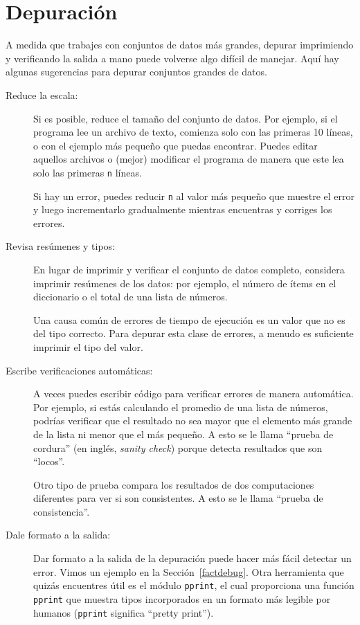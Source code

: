 \documentclass[10pt]{book}
\begin{document}
\section{Depuración}

A medida que trabajes con conjuntos de datos más grandes, depurar imprimiendo y
verificando la salida a mano puede volverse algo difícil de manejar.  Aquí hay algunas
sugerencias para depurar conjuntos grandes de datos.

\begin{description}

\item[Reduce la escala:] Si es posible, reduce el tamaño del
conjunto de datos.  Por ejemplo, si el programa lee un archivo de texto, comienza 
solo con las primeras 10 líneas, o con el ejemplo más pequeño que puedas encontrar.
Puedes editar aquellos archivos o (mejor) modificar el
programa de manera que este lea solo las primeras {\tt n} líneas.

Si hay un error, puedes reducir {\tt n} al valor más pequeño
que muestre el error y luego incrementarlo gradualmente
mientras encuentras y corriges los errores.

\item[Revisa resúmenes y tipos:] En lugar de imprimir y verificar el conjunto
de datos completo, considera imprimir resúmenes de los datos: por ejemplo,
el número de ítems en el diccionario o el total de una lista de números.

Una causa común de errores de tiempo de ejecución es un valor que no es del tipo
correcto.  Para depurar esta clase de errores, a menudo es suficiente imprimir
el tipo del valor.

\item[Escribe verificaciones automáticas:]  A veces puedes escribir código para verificar
errores de manera automática. Por ejemplo, si estás calculando el
promedio de una lista de números, podrías verificar que el resultado no
sea mayor que el elemento más grande de la lista ni menor que
el más pequeño. A esto se le llama ``prueba de cordura'' (en inglés, {\em sanity check})
porque detecta resultados que son ``locos''.

Otro tipo de prueba compara los resultados de dos computaciones
diferentes para ver si son consistentes. A esto se le llama
``prueba de consistencia''.

\item[Dale formato a la salida:] Dar formato a la salida de la depuración
puede hacer más fácil detectar un error.  Vimos un ejemplo en la 
Sección~\ref{factdebug}.  Otra herramienta que quizás encuentres útil es el módulo {\tt pprint},
el cual proporciona una función {\tt pprint} que muestra tipos incorporados en
un formato más legible por humanos ({\tt pprint} significa
``pretty print'').

\end{description}
\end{document}
